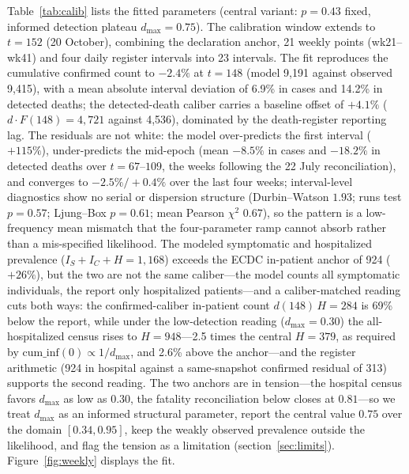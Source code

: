 \documentclass[10pt]{plos}
\begin{document}
Table~\ref{tab:calib} lists the fitted parameters (central variant:
$p=0.43$ fixed, informed detection plateau $d_{\max}=0.75$). The
calibration window extends to $t=152$ (20 October), combining the
declaration anchor, 21 weekly points (wk21--wk41) and four daily
register intervals into 23 intervals. The fit reproduces the cumulative
confirmed count to $-2.4\%$ at $t=148$ (model 9{,}191 against observed
9,415), with a mean absolute interval deviation of 6.9\% in cases and
14.2\% in detected deaths; the detected-death caliber carries a baseline
offset of $+4.1\%$ ($d\cdot F(148)=4{,}721$ against 4,536), dominated by
the death-register reporting lag. The residuals are not white: the model
over-predicts the first interval ($+115\%$), under-predicts the
mid-epoch (mean $-8.5\%$ in cases and $-18.2\%$ in detected deaths over
$t=67$--$109$, the weeks following the 22 July reconciliation), and
converges to $-2.5\%/+0.4\%$ over the last four weeks; interval-level
diagnostics show no serial or dispersion structure (Durbin--Watson
$1.93$; runs test $p=0.57$; Ljung--Box $p=0.61$; mean Pearson $\chi^2$
$0.67$), so the pattern is a low-frequency mean mismatch that the
four-parameter ramp cannot absorb rather than a mis-specified
likelihood. The modeled symptomatic and hospitalized prevalence
($I_S+I_C+H=1{,}168$) exceeds the ECDC in-patient anchor of 924
($+26\%$), but the two are not the same caliber---the model counts all
symptomatic individuals, the report only hospitalized patients---and a
caliber-matched reading cuts both ways: the confirmed-caliber in-patient
count $d(148)\,H=284$ is 69\% below the report, while under the
low-detection reading ($d_{\max}=0.30$) the all-hospitalized census
rises to $H=948$---2.5 times the central $H=379$, as required by
$\mathrm{cum\_inf}(0)\propto 1/d_{\max}$, and 2.6\% above the
anchor---and the register arithmetic (924 in hospital against a
same-snapshot confirmed residual of 313) supports the second reading.
The two anchors are in tension---the hospital census favors $d_{\max}$
as low as $0.30$, the fatality reconciliation below closes at
$0.81$---so we treat $d_{\max}$ as an informed structural parameter,
report the central value $0.75$ over the domain $[0.34,0.95]$, keep the
weakly observed prevalence outside the likelihood, and flag the tension
as a limitation (section~\ref{sec:limits}). Figure~\ref{fig:weekly}
displays the fit.
\end{document}
